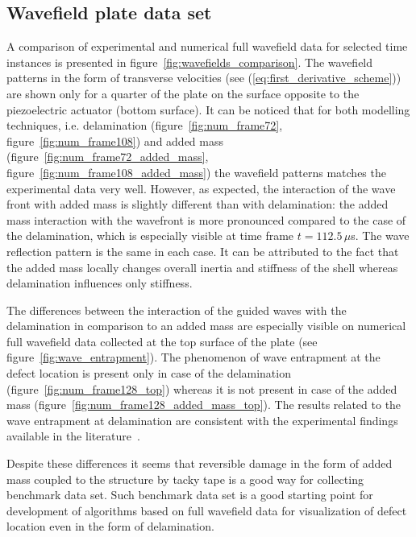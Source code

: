 \documentclass[12pt]{iopart}
\begin{document}
\subsection{Wavefield plate data set }
A comparison of experimental and numerical full wavefield data for selected time instances is presented in figure~\ref{fig:wavefields_comparison}. The wavefield patterns in the form of transverse velocities (see (\ref{eq:first_derivative_scheme})) are shown only for a quarter of the plate on the surface opposite to the piezoelectric actuator (bottom surface). It can be noticed that for both modelling techniques, i.e. delamination (figure~\ref{fig:num_frame72}, figure~\ref{fig:num_frame108}) and added mass (figure~\ref{fig:num_frame72_added_mass}, figure~\ref{fig:num_frame108_added_mass})	the wavefield patterns matches the experimental data very well. However, as expected, the interaction of the wave front with added mass is slightly different than with delamination: the added mass interaction with the wavefront is more pronounced compared to the case of the delamination, which is especially visible at time frame \(t=112.5\,  \mu\)s. The wave reflection pattern is the same in each case. It can be attributed to the fact that the added mass locally changes overall inertia and stiffness of the shell whereas delamination influences only stiffness. 

The differences between the interaction of the guided waves with the delamination in comparison to an added mass are especially visible on numerical full wavefield data collected at the top surface of the plate (see figure~\ref{fig:wave_entrapment}). The phenomenon of wave entrapment at the defect location is present only in case of the delamination (figure~\ref{fig:num_frame128_top}) whereas it is not present in case of the added mass (figure~\ref{fig:num_frame128_added_mass_top}). The results related to the wave entrapment at delamination are consistent with the experimental findings available in the literature~\cite{Glushkov2012}. 

Despite these differences it seems that reversible damage in the form of added mass coupled to the structure by tacky tape is a good way for collecting benchmark data set. Such benchmark data set is a good starting point for development of algorithms based on full wavefield data for visualization of defect location even in the form of delamination.
\end{document}

